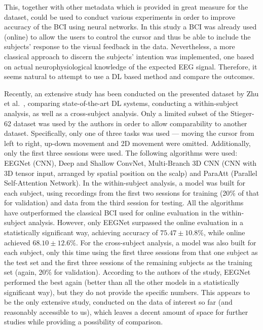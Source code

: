 \documentclass[english, he, bc, kiv, iso690alph]{fasthesis}
\begin{document}
This, together with other metadata which is provided in great measure for the dataset, could be used to conduct various experiments in order to improve accuracy of the BCI using neural networks.
In this study a BCI was already used (online) to allow the users to control the cursor and thus be able to include the subjects' response to the visual feedback in the data. Nevertheless, a more classical approach to discern the subjects' intention was implemented, one based on actual neurophysiological knowledge of the expected EEG signal. Therefore, it seems natural to attempt to use a DL based method and compare the outcomes.

Recently, an extensive study has been conducted on the presented dataset by Zhu et al.~\cite{zhu:dl:bci:mi:22}, comparing state-of-the-art DL systems, conducting a within-subject analysis, as well as a cross-subject analysis. Only a limited subset of the Stieger-62 dataset was used by the authors in order to allow comparability to another dataset. Specifically, only one of three tasks was used --- moving the cursor from left to right, up-down movement and 2D movement were omitted. Additionally, only the first three sessions were used.
The following algorithms were used: EEGNet (CNN), Deep and Shallow ConvNet, Multi-Branch 3D CNN (CNN with 3D tensor input, arranged by spatial position on the scalp) and ParaAtt (Parallel Self-Attention Network). In the within-subject analysis, a model was built for each subject, using recordings from the first two sessions for training (20\% of that for validation) and data from the third session for testing. All the algorithms have outperformed the classical BCI used for online evaluation in the within-subject analysis. However, only EEGNet surpassed the online evaluation in a statistically significant way, achieving accuracy of $75.47 \pm 10.8\%$, while online achieved $68.10 \pm 12.6\%$.\@
For the cross-subject analysis, a model was also built for each subject, only this time using the first three sessions from that one subject as the test set  and the first three sessions of the remaining subjects as the training set (again, 20\% for validation). According to the authors of the study, EEGNet performed the best again (better than all the other models in a statistically significant way), but they do not provide the specific numbers.
This appears to be the only extensive study, conducted on the data of interest so far (and reasonably accessible to us), which leaves a decent amount of space for further studies while providing a possibility of comparison.
\end{document}
